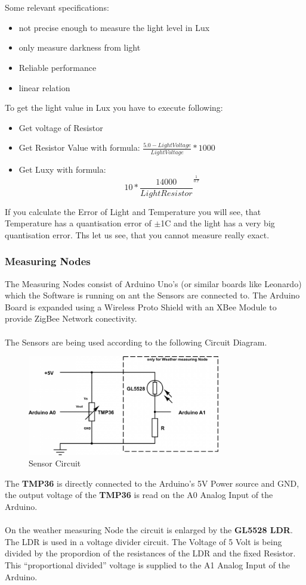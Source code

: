 \documentclass[
	11pt,
	a4paper
]{article}%
\begin{document}
\\\\
Some relevant specifications:
\begin{itemize}
\item not precise enough to measure the light level in Lux
\item only measure darkness from light
\item Reliable performance
\item linear relation
\end{itemize}
To get the light value in Lux you have to execute following:
\begin{itemize}
\item Get voltage of Resistor
\item Get Resistor Value with formula: $\frac{5.0-LightVoltage}{LightVoltage}*1000$
\item Get Luxy with formula: 
	\begin{equation*}
		10*\frac{14000}{Light Resistor}^\frac{1}{0.7}
	\end{equation*}
\end{itemize}
If you calculate the Error of Light and Temperature you will see, that Temperature has a quantisation error of $\pm$1\degree C and the light has a very big quantisation error. Ths let us see, that you cannot measure really exact.

\subsubsection{Measuring Nodes}
The Measuring Nodes consist of Arduino Uno's (or similar boards like Leonardo) which the Software is running on ant the Sensors are connected to. The Arduino Board is expanded using a Wireless Proto Shield with an XBee Module to provide ZigBee Network conectivity.
\\\\
The Sensors are being used according to the following Circuit Diagram.
\begin{figure}[h!]
  \caption{Sensor Circuit}
  \centering
    \includegraphics[width=0.75\textwidth]{../Images/Circuit.png}
\end{figure}
The \textbf{TMP36} is directly connected to the Arduino's 5V Power source and GND, the output voltage of the \textbf{TMP36} is read on the A0 Analog Input of the Arduino.
\\\\
On the weather measuring Node the circuit is enlarged by the \textbf{GL5528 LDR}. The LDR is used in a voltage divider circuit. The Voltage of 5 Volt is being divided by the propordion of the resistances of the LDR and the fixed Resistor. This “proportional divided” voltage is supplied to the A1 Analog Input of the Arduino.
\end{document}
